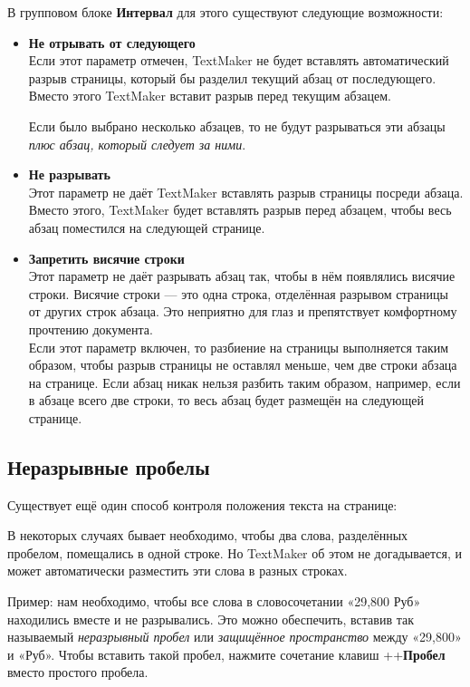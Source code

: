 ﻿\documentclass[a4paper,10pt]{article}
\begin{document}
В групповом блоке \textbf{Интервал} для этого существуют следующие возможности:
\begin{itemize}
 \item \textbf{Не отрывать от следующего}\\
 Если этот параметр отмечен, TextMaker не будет вставлять автоматический разрыв страницы, который бы разделил текущий абзац от последующего. Вместо этого TextMaker вставит разрыв перед текущим абзацем.
 
 Если было выбрано несколько абзацев, то не будут разрываться эти абзацы \textit{плюс абзац, который следует за ними}.
 \item \textbf{Не разрывать}\\
 Этот параметр не даёт TextMaker вставлять разрыв страницы посреди абзаца. Вместо этого, TextMaker будет вставлять разрыв перед абзацем, чтобы весь абзац поместился на следующей странице.
 \item \textbf{Запретить висячие строки}\\
 Этот параметр не даёт разрывать абзац так, чтобы в нём появлялись висячие строки. Висячие строки — это одна строка, отделённая разрывом страницы от других строк абзаца. Это неприятно для глаз и препятствует комфортному прочтению документа.\\
 Если этот параметр включен, то разбиение на страницы выполняется таким образом, чтобы разрыв страницы не оставлял меньше, чем две строки абзаца на странице. Если абзац никак нельзя разбить таким образом, например, если в абзаце всего две строки, то весь абзац будет размещён на следующей странице.
\end{itemize}

\subsection{Неразрывные пробелы}
Существует ещё один способ контроля положения текста на странице:

В некоторых случаях бывает необходимо, чтобы два слова, разделённых пробелом, помещались в одной строке. Но TextMaker об этом не догадывается, и может автоматически разместить эти слова в разных строках. 

Пример: нам необходимо, чтобы все слова в словосочетании «29,800 Руб» находились вместе и не разрывались. Это можно обеспечить, вставив так называемый \textit{неразрывный пробел} или \textit{защищённое пространство} между «29,800» и «Руб». Чтобы вставить такой пробел, нажмите сочетание клавиш ++\textbf{Пробел} вместо простого пробела.
\end{document}
